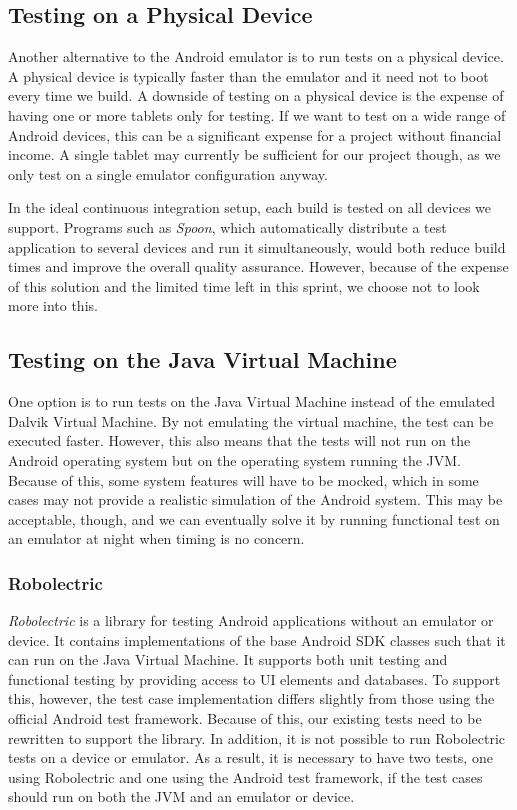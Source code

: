 \subsection{Testing on a Physical Device}
Another alternative to the Android emulator is to run tests on a physical device. A physical device is typically faster than the emulator and it need not to boot every time we build. A downside of testing on a physical device is the expense of having one or more tablets only for testing. If we want to test on a wide range of Android devices, this can be a significant expense for a project without financial income. A single tablet may currently be sufficient for our project though, as we only test on a single emulator configuration anyway.

In the ideal continuous integration setup, each build is tested on all devices we support. Programs such as \emph{Spoon}\parencite{spoon2015}, which automatically distribute a test application to several devices and run it simultaneously, would both reduce build times and improve the overall quality assurance. However, because of the expense of this solution and the limited time left in this sprint, we choose not to look more into this.

\subsection{Testing on the Java Virtual Machine}
One option is to run tests on the Java Virtual Machine instead of the emulated Dalvik Virtual Machine. By not emulating the virtual machine, the test can be executed faster. However, this also means that the tests will not run on the Android operating system but on the operating system running the JVM\@. Because of this, some system features will have to be mocked, which in some cases may not provide a realistic simulation of the Android system. This may be acceptable, though, and we can eventually solve it by running functional test on an emulator at night when timing is no concern.

\subsubsection{Robolectric}
\emph{Robolectric}\parencite{robolectric2015} is a library for testing Android applications without an emulator or device. It contains implementations of the base Android SDK classes such that it can run on the Java Virtual Machine. It supports both unit testing and functional testing by providing access to UI elements and databases. To support this, however, the test case implementation differs slightly from those using the official Android test framework. Because of this, our existing tests need to be rewritten to support the library. In addition, it is not possible to run Robolectric tests on a device or emulator. As a result, it is necessary to have two tests, one using Robolectric and one using the Android test framework, if the test cases should run on both the JVM and an emulator or device.

